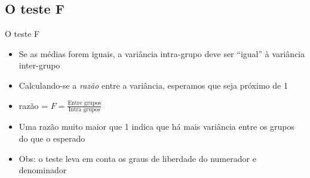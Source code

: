 \documentclass{beamer}
\begin{document}






\subsection{O teste F}

\begin{frame}{O teste F}
  \begin{itemize}
  \item Se as médias forem iguais, a variância intra-grupo deve ser ``igual'' à variância inter-grupo
  \item Calculando-se a {\em razão} entre a variância, esperamos que seja próximo de 1
  \item razão = $F = \frac{\text{Entre grupos}}{\text{Intra grupos}}$
  \item Uma razão muito maior que 1 indica que há mais variância entre os grupos do que o esperado
  \item Obs: o teste leva em conta os graus de liberdade do numerador e denominador
  \end{itemize}
\end{frame}
\end{document}
